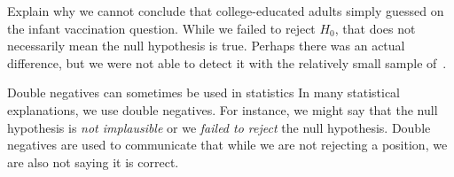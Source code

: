 \begin{examplewrap}
\begin{nexample}{Explain why we cannot conclude that
    college-educated adults simply guessed on the
    infant vaccination question.}
  While we failed to reject $H_0$, that does not
  necessarily mean the null hypothesis is true.
  Perhaps there was an actual difference,
  but we were not able to detect it with the
  relatively small sample of~\roslingAsize{}.

\end{nexample}
\end{examplewrap}

\begin{onebox}{Double negatives can sometimes be used in statistics}
  In many statistical explanations, we use double negatives.
  For instance, we might say that the null hypothesis is
  \emph{not implausible} or we \emph{failed to reject}
  the null hypothesis.
  Double negatives are used to communicate that while we
  are not rejecting a position, we are also not saying it
  is correct.
\end{onebox}

